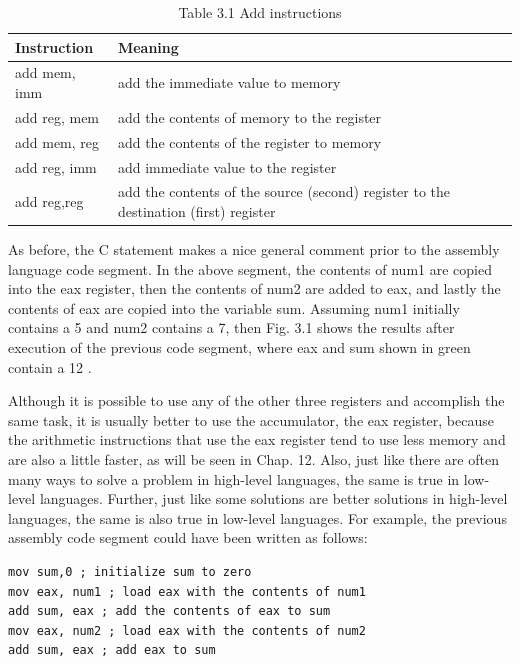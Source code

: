 \documentclass[10pt]{book}
\begin{document}
\begin{table}[htbp]
\begin{center}
\captionsetup{labelformat=empty}
\caption{Table 3.1 Add instructions}
\begin{tabular}{|l|l|}
\hline
Instruction & Meaning \\
\hline
add mem, imm & add the immediate value to memory \\
\hline
add reg, mem & add the contents of memory to the register \\
\hline
add mem, reg & add the contents of the register to memory \\
\hline
add reg, imm & add immediate value to the register \\
\hline
add reg,reg & add the contents of the source (second) register to the destination (first) register \\
\hline
\end{tabular}
\end{center}
\end{table}

As before, the C statement makes a nice general comment prior to the assembly language code segment. In the above segment, the contents of num1 are copied into the eax register, then the contents of num2 are added to eax, and lastly the contents of eax are copied into the variable sum. Assuming num1 initially contains a 5 and num2 contains a 7, then Fig. 3.1 shows the results after execution of the previous code segment, where eax and sum shown in green contain a 12 .

Although it is possible to use any of the other three registers and accomplish the same task, it is usually better to use the accumulator, the eax register, because the arithmetic instructions that use the eax register tend to use less memory and are also a little faster, as will be seen in Chap. 12. Also, just like there are often many ways to solve a problem in high-level languages, the same is true in low-level languages. Further, just like some solutions are better solutions in high-level languages, the same is also true in low-level languages. For example, the previous assembly code segment could have been written as follows:

\begin{verbatim}
mov sum,0 ; initialize sum to zero
mov eax, num1 ; load eax with the contents of num1
add sum, eax ; add the contents of eax to sum
mov eax, num2 ; load eax with the contents of num2
add sum, eax ; add eax to sum
\end{verbatim}
\end{document}
